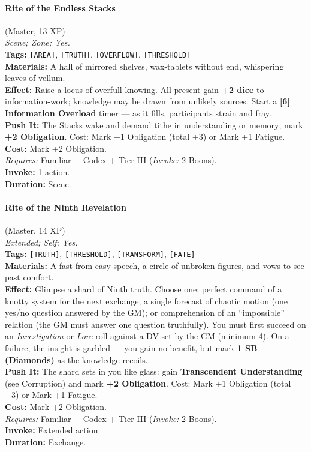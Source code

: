 \paragraph{Rite of the Endless Stacks} (Master, 13 XP) \hfill \\
\emph{Scene; Zone; Yes.} \\
\textbf{Tags:} \texttt{[AREA]}, \texttt{[TRUTH]}, \texttt{[OVERFLOW]}, \texttt{[THRESHOLD]} \\
\textbf{Materials:} A hall of mirrored shelves, wax-tablets without end, whispering leaves of vellum. \\
\textbf{Effect:} Raise a locus of overfull knowing. All present gain \textbf{+2 dice} to information-work; knowledge may be drawn from unlikely sources. Start a \textbf{[6] Information Overload} timer --- as it fills, participants strain and fray. \\
\textbf{Push It:} The Stacks wake and demand tithe in understanding or memory; mark \textbf{+2 Obligation}. Cost: Mark +1 Obligation (total +3) or Mark +1 Fatigue. \\
\textbf{Cost:} Mark +2 Obligation. \\
\textit{Requires:} Familiar + Codex + Tier III (\textit{Invoke:} 2 Boons). \\
\textbf{Invoke:} 1 action. \\
\textbf{Duration:} Scene.

\paragraph{Rite of the Ninth Revelation} (Master, 14 XP) \hfill \\
\emph{Extended; Self; Yes.} \\
\textbf{Tags:} \texttt{[TRUTH]}, \texttt{[THRESHOLD]}, \texttt{[TRANSFORM]}, \texttt{[FATE]} \\
\textbf{Materials:} A fast from easy speech, a circle of unbroken figures, and vows to see past comfort. \\
\textbf{Effect:} Glimpse a shard of Ninth truth. Choose one: perfect command of a knotty system for the next exchange; a single forecast of chaotic motion (one yes/no question answered by the GM); or comprehension of an ``impossible'' relation (the GM must answer one question truthfully). You must first succeed on an \textit{Investigation} or \textit{Lore} roll against a DV set by the GM (minimum 4). On a failure, the insight is garbled --- you gain no benefit, but mark \textbf{1 SB (Diamonds)} as the knowledge recoils. \\
\textbf{Push It:} The shard sets in you like glass: gain \textbf{Transcendent Understanding} (see Corruption) and mark \textbf{+2 Obligation}. Cost: Mark +1 Obligation (total +3) or Mark +1 Fatigue. \\
\textbf{Cost:} Mark +2 Obligation. \\
\textit{Requires:} Familiar + Codex + Tier III (\textit{Invoke:} 2 Boons). \\
\textbf{Invoke:} Extended action. \\
\textbf{Duration:} Exchange.

